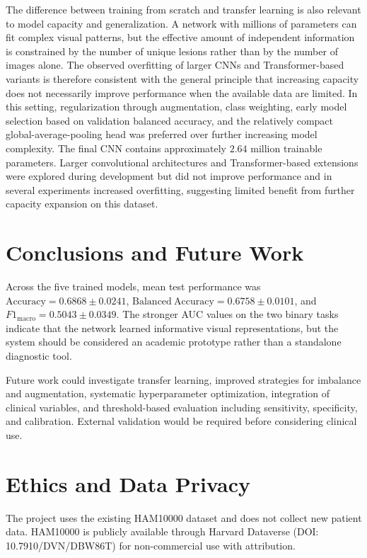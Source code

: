 \documentclass[11pt,a4paper]{article}
\begin{document}
The difference between training from scratch and transfer learning is also relevant to model capacity and generalization. A network with millions of parameters can fit complex visual patterns, but the effective amount of independent information is constrained by the number of unique lesions rather than by the number of images alone. The observed overfitting of larger CNNs and Transformer-based variants is therefore consistent with the general principle that increasing capacity does not necessarily improve performance when the available data are limited. In this setting, regularization through augmentation, class weighting, early model selection based on validation balanced accuracy, and the relatively compact global-average-pooling head was preferred over further increasing model complexity.
 The final CNN contains approximately $2.64$ million trainable parameters. Larger convolutional architectures and Transformer-based extensions were explored during development but did not improve performance and in several experiments increased overfitting, suggesting limited benefit from further capacity expansion on this dataset.

\section{Conclusions and Future Work}
Across the five trained models, mean test performance was $\mathrm{Accuracy}=0.6868\pm0.0241$, $\mathrm{Balanced\ Accuracy}=0.6758\pm0.0101$, and $F1_{\mathrm{macro}}=0.5043\pm0.0349$. The stronger AUC values on the two binary tasks indicate that the network learned informative visual representations, but the system should be considered an academic prototype rather than a standalone diagnostic tool.

Future work could investigate transfer learning, improved strategies for imbalance and augmentation, systematic hyperparameter optimization, integration of clinical variables, and threshold-based evaluation including sensitivity, specificity, and calibration. External validation would be required before considering clinical use.

\section{Ethics and Data Privacy}
The project uses the existing HAM10000 dataset and does not collect new patient data. HAM10000 is publicly available through Harvard Dataverse (DOI: 10.7910/DVN/DBW86T) for non-commercial use with attribution. %
\end{document}
